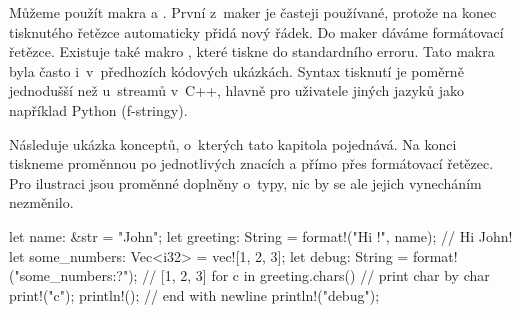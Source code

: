 \documentclass[main.tex]{subfiles}
\begin{document}

Můžeme použít makra  a . První z~maker je časteji
používané, protože na konec tisknutého řetězce automaticky přidá nový řádek. Do maker
dáváme formátovací řetězce. Existuje také makro , které tiskne do
standardního erroru. Tato makra byla často i~v~předhozích kódových ukázkách. Syntax
tisknutí je poměrně jednodušší než u~streamů v~C++, hlavně pro uživatele jiných jazyků
jako například Python (f-stringy).

Následuje ukázka konceptů, o~kterých tato kapitola pojednává. Na konci tiskneme proměnnou
 po jednotlivých znacích a  přímo přes formátovací řetězec.
Pro ilustraci jsou proměnné doplněny o~typy, nic by se ale jejich vynecháním nezměnilo.

\obrazek
\begin{rustcode}
    let name: &str = "John";
    let greeting: String = format!("Hi {}!", name); // Hi John!
    let some_numbers: Vec<i32> = vec![1, 2, 3];
    let debug: String = format!("{some_numbers:?}"); // [1, 2, 3]
    for c in greeting.chars() {
        // print char by char
        print!("{c}");
    }
    println!(); // end with newline
    println!("{debug}");
\end{rustcode}
\end{document}
